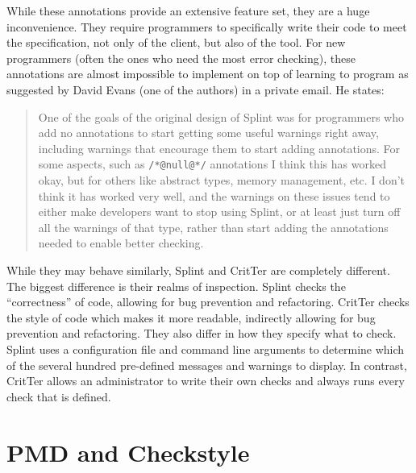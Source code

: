 \documentclass[12pt]{report}
\newcommand{\programName}{CritTer\xspace}
\begin{document}
While these annotations provide an extensive feature set, they are a huge inconvenience. They 
require programmers to specifically write their code to meet the specification, not only of the client, but 
also of the tool. For new programmers (often the ones who need the most error checking), these 
annotations are almost impossible to implement on top of learning to program as suggested by  
David Evans (one of the authors) in a private email. He states:
\begin{quote} \singlespacing
One of the goals of the original design of 
Splint was for programmers who add no annotations to start getting some useful warnings right away, 
including warnings that encourage them to start adding annotations.  For some aspects, such as 
\lstinline{/*@null@*/} annotations I think this has worked okay, but for others like abstract types, 
memory management, etc. I don't think it has worked very well, and the warnings on these issues tend 
to either make developers want to stop using Splint, or at least just turn off all the warnings of that type, 
rather than start adding the annotations needed to enable better checking.\cite{evans-email} 
\end{quote}

While they may behave similarly, Splint and \programName are completely different. The biggest 
difference is their realms of inspection. Splint checks the ``correctness'' of code, allowing for bug 
prevention and refactoring. \programName checks the style of code which makes it more readable, 
indirectly allowing for bug prevention and refactoring. They also differ in how they specify what to check. 
Splint uses a configuration file and command line arguments to determine which of the several hundred 
pre-defined messages and warnings to display. In contrast, \programName allows an administrator to 
write their own checks and always runs every check that is defined.

\section{PMD and Checkstyle}
\label{sec:pmdAndCheckstyle}
\end{document}
